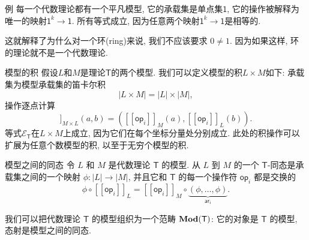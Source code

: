 \documentclass{beamer}
\newcommand{\theory}[1]{\mathsf{#1}} %
\newcommand{\equations}[1]{\mathcal{E}_{\theory{#1}}} %
\newcommand{\Mod}[1]{\text{\textbf{Mod}}(\theory{#1})} %
\newcommand{\carrier}[1]{|#1|} %
\newcommand{\op}[1]{\mathsf{op}_{#1}} %
\newcommand{\arity}[1]{\mathsf{ar}_{#1}} %
\newcommand{\one}{\mathsf{1}} %
\newcommand{\sem}[1]{[\![#1]\!]} %
\begin{document}
\begin{frame}{例}
  每一个代数理论都有一个平凡模型, 它的承载集是单点集$\one$, 它的操作被解释为唯一的映射$\one^k → \one$. 所有等式成立, 因为任意两个映射$\one^k → \one$是相等的.

  \vspace{6mm}

  这就解释了为什么对一个环(ring)来说, 我们不应该要求 $0 ≠ 1$. 因为如果这样, 环的理论就不是一个代数理论.
\end{frame}

\begin{frame}{模型的积}
  假设$L$和$M$是理论$\theory{T}$的两个模型. 我们可以定义模型的积$L× M$如下: 承载集为模型承载集的笛卡尔积
  \begin{equation*}
  \carrier{L × M} = \carrier{L} × \carrier{M},
  \end{equation*}
操作逐点计算
\begin{equation*}
  \sem{\op{i}}_{M × L}(a, b) = (\sem{\op{i}}_M(a), \sem{\op{i}}_L(b)).
\end{equation*}
等式$\equations{T}$在$L× M$上成立, 因为它们在每个坐标分量处分别成立. 此处的积操作可以扩展为任意个数模型的积, 以至于无穷个模型的积.
\end{frame}

\begin{frame}{模型之间的同态}
  令 $L$ 和 $M$ 是代数理论 $\theory{T}$ 的模型. 从 $L$ 到 $M$ 的一个 $\theory{T}$-同态是承载集之间的一个映射 $\phi : \carrier{L} → \carrier{M}$, 并且它和 $\theory{T}$ 的每一个操作符 $\op{i}$ 都是交换的
  \begin{equation*}
  ϕ ∘ \sem{\op{i}}_L = \sem{\op{i}}_M ∘ \underbrace{(\phi, …, \phi)}_{\arity{i}}.
  \end{equation*}

  \vspace{10mm}

  我们可以把代数理论 $\theory{T}$ 的模型组织为一个范畴 $\Mod{T}$: 它的对象是 $\theory{T}$ 的模型, 态射是模型之间的同态.
\end{frame}
\end{document}

